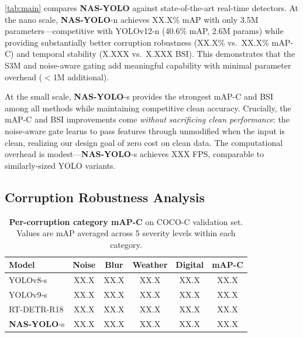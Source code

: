 \documentclass[review]{eccv2026}
\newcommand{\ours}{\textbf{NAS-YOLO}}
\newcommand{\nasNmap}{XX.X}
\newcommand{\nasNmapC}{XX.X}
\newcommand{\nasNbsi}{X.XXX}
\newcommand{\nasSmapC}{XX.X}
\newcommand{\nasSfps}{XXX}
\newcommand{\yoloTwelveNmapC}{XX.X}
\newcommand{\yoloTwelveNbsi}{X.XXX}
\newcommand{\yoloEightSmapC}{XX.X}
\newcommand{\yoloNineSmapC}{XX.X}
\newcommand{\rtdetrMapC}{XX.X}
\newcommand{\nasSNoise}{XX.X}
\newcommand{\nasSBlur}{XX.X}
\newcommand{\nasSWeather}{XX.X}
\newcommand{\nasSDigital}{XX.X}
\newcommand{\yoloEightSNoise}{XX.X}
\newcommand{\yoloEightSBlur}{XX.X}
\newcommand{\yoloEightSWeather}{XX.X}
\newcommand{\yoloEightSDigital}{XX.X}
\newcommand{\yoloNineSNoise}{XX.X}
\newcommand{\yoloNineSBlur}{XX.X}
\newcommand{\yoloNineSWeather}{XX.X}
\newcommand{\yoloNineSDigital}{XX.X}
\newcommand{\rtdetrNoise}{XX.X}
\newcommand{\rtdetrBlur}{XX.X}
\newcommand{\rtdetrWeather}{XX.X}
\newcommand{\rtdetrDigital}{XX.X}
\begin{document}
\cref{tab:main} compares \ours{} against state-of-the-art real-time detectors.
At the nano scale, \ours{}-n achieves \nasNmap\% mAP with only 3.5M parameters---competitive with YOLOv12-n (40.6\% mAP, 2.6M params) while providing substantially better corruption robustness (\nasNmapC\% vs.\ \yoloTwelveNmapC\% mAP-C) and temporal stability (\nasNbsi{} vs.\ \yoloTwelveNbsi{} BSI).
This demonstrates that the S3M and noise-aware gating add meaningful capability with minimal parameter overhead ($<$1M additional).

At the small scale, \ours{}-s provides the strongest mAP-C and BSI among all methods while maintaining competitive clean accuracy.
Crucially, the mAP-C and BSI improvements come \textit{without sacrificing clean performance}: the noise-aware gate learns to pass features through unmodified when the input is clean, realizing our design goal of zero cost on clean data.
The computational overhead is modest---\ours{}-s achieves \nasSfps{} FPS, comparable to similarly-sized YOLO variants.

\subsection{Corruption Robustness Analysis}

\begin{table}[t]
  \centering
  \caption{\textbf{Per-corruption category mAP-C} on COCO-C validation set. Values are mAP averaged across 5 severity levels within each category.}
  \label{tab:corruption}
  \vspace{4pt}
  \small
  \setlength{\tabcolsep}{3pt}
  \begin{tabular}{l|cccc|c}
    \toprule
    \textbf{Model} & \textbf{Noise} & \textbf{Blur} & \textbf{Weather} & \textbf{Digital} & \textbf{mAP-C} \\
    \midrule
    YOLOv8-s & \yoloEightSNoise & \yoloEightSBlur & \yoloEightSWeather & \yoloEightSDigital & \yoloEightSmapC \\
    YOLOv9-s & \yoloNineSNoise & \yoloNineSBlur & \yoloNineSWeather & \yoloNineSDigital & \yoloNineSmapC \\
    RT-DETR-R18 & \rtdetrNoise & \rtdetrBlur & \rtdetrWeather & \rtdetrDigital & \rtdetrMapC \\
    \rowcolor{bestcolor} \ours{}-s & \nasSNoise & \nasSBlur & \nasSWeather & \nasSDigital & \nasSmapC \\
    \bottomrule
  \end{tabular}
\end{table}
\end{document}
